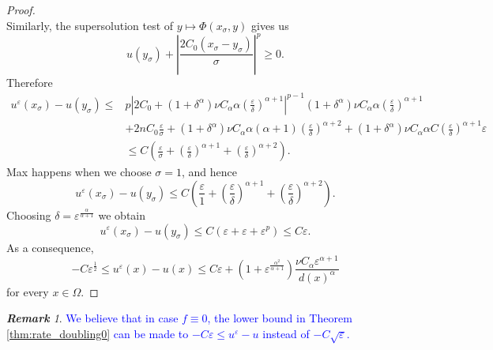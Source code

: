 \documentclass[11pt,reqno]{amsart}
\numberwithin{figure}{section}
\theoremstyle{plain}
\theoremstyle{remark}
\newtheorem{rem}{\bf{Remark}}
\numberwithin{equation}{section}
\begin{document}
\begin{proof}
\begin{equation*}
\end{equation*}
Similarly, the supersolution test of $y\mapsto \Phi(x_\sigma,y)$ gives us
\begin{equation*}
    u(y_\sigma) + \left|\frac{2C_0(x_\sigma-y_\sigma)}{\sigma}\right|^p \geq 0.
\end{equation*}
Therefore
\begin{equation}
\label{doubling}
\begin{split}
    u^\varepsilon(x_\sigma) - u(y_\sigma) \leq & p\left|2C_0+(1+\delta^\alpha)\nu C_\alpha \alpha\left( \frac{\varepsilon}{\delta}\right)^{\alpha+1}\right|^{p-1}(1+\delta^\alpha) \nu C_\alpha \alpha \left(\frac{\varepsilon}{\delta}\right)^{\alpha+1} \\
    &+2nC_0\frac{\varepsilon}{\sigma} + (1+\delta^\alpha)\nu C_\alpha \alpha(\alpha+1)\left(\frac{\varepsilon}{\delta}\right)^{\alpha+2} + (1+\delta^\alpha)\nu C_\alpha \alpha C \left(\frac{\varepsilon}{\delta}\right)^{\alpha+1}\varepsilon\\
    &\leq C\left(\frac{\varepsilon}{\sigma} + \left(\frac{\varepsilon}{\delta}\right)^{\alpha+1} + \left(\frac{\varepsilon}{\delta}\right)^{\alpha+2} \right).
\end{split}
\end{equation}
Max happens when we choose $\sigma = 1$, and hence
\begin{equation*}
    u^\varepsilon(x_\sigma) - u(y_\sigma) \leq C\left( \frac{\varepsilon}{1} + \left(\frac{\varepsilon}{\delta}\right)^{\alpha+1} + \left(\frac{\varepsilon}{\delta}\right)^{\alpha+2}\right).
\end{equation*}
Choosing $\delta = \varepsilon^\frac{\alpha}{\alpha+1}$ we obtain 
\begin{equation*}
    u^\varepsilon(x_\sigma) - u(y_\sigma) \leq C(\varepsilon + \varepsilon + \varepsilon ^p ) \leq C\varepsilon.
\end{equation*}
As a consequence, 
\begin{equation}
\label{zerodata}
   -C \varepsilon^{\frac{1}{2}}\leq  u^\varepsilon(x) - u(x) \leq C\varepsilon + \left(1+\varepsilon^{\frac{\alpha^2}{\alpha+1}}\right)\frac{\nu C_\alpha  \varepsilon^{\alpha+1}}{d(x)^\alpha} 
\end{equation}
for every $x\in \Omega$.
\end{proof}

\begin{rem} \textcolor{blue}{We believe that in case $f\equiv  0$, the lower bound in Theorem \ref{thm:rate_doubling0} can be made to $-C\varepsilon \leq u^\varepsilon - u$ instead of $-C\sqrt{\varepsilon}$.}
\end{rem}
\end{document}
